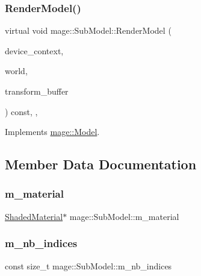\subsubsection{\texorpdfstring{Render\+Model()}{RenderModel()}}
{\footnotesize\ttfamily virtual void mage\+::\+Sub\+Model\+::\+Render\+Model (\begin{DoxyParamCaption}\item[{I\+D3\+D11\+Device\+Context2 \&}]{device\+\_\+context,  }\item[{const \hyperlink{classmage_1_1_world}{World} \&}]{world,  }\item[{const \hyperlink{structmage_1_1_transform_buffer}{Transform\+Buffer} \&}]{transform\+\_\+buffer }\end{DoxyParamCaption}) const\hspace{0.3cm}{\ttfamily [override]}, {\ttfamily [protected]}, {\ttfamily [virtual]}}



Implements \hyperlink{classmage_1_1_model_a2e455bf2998946d776b4056568a1c816}{mage\+::\+Model}.



\subsection{Member Data Documentation}
\hypertarget{classmage_1_1_sub_model_ac32eea7a1db56906ebf63b8683231999}{}\label{classmage_1_1_sub_model_ac32eea7a1db56906ebf63b8683231999} 
\subsubsection{\texorpdfstring{m\+\_\+material}{m\_material}}
{\footnotesize\ttfamily \hyperlink{structmage_1_1_shaded_material}{Shaded\+Material}$\ast$ mage\+::\+Sub\+Model\+::m\+\_\+material\hspace{0.3cm}{\ttfamily [private]}}

\hypertarget{classmage_1_1_sub_model_a0471b8b0c4b7be0e696378238b25e7e7}{}\label{classmage_1_1_sub_model_a0471b8b0c4b7be0e696378238b25e7e7} 
\subsubsection{\texorpdfstring{m\+\_\+nb\+\_\+indices}{m\_nb\_indices}}
{\footnotesize\ttfamily const size\+\_\+t mage\+::\+Sub\+Model\+::m\+\_\+nb\+\_\+indices\hspace{0.3cm}{\ttfamily [private]}}

